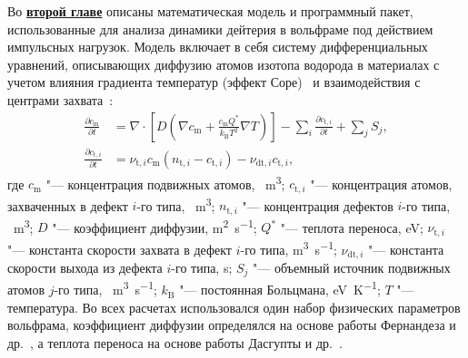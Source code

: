 Во \underline{\textbf{второй главе}} описаны математическая модель и программный пакет, использованные для анализа динамики дейтерия в вольфраме под действием импульсных нагрузок. Модель включает в себя систему дифференциальных уравнений, описывающих диффузию атомов изотопа водорода в материалах с учетом влияния градиента температур (эффект Соре)~\cite{Longhurst1985} и взаимодействия с центрами захвата~\cite{McNabb1963}: 
\begin{subequations}
    \label{eq:hydrogen_transport}
    \begin{align}
        \frac{\partial c_\mathrm{m}}{\partial t} & = \nabla \cdot \left[ D \left( \nabla c_\mathrm{m} + \frac{c_\mathrm{m} Q^*}{k_\mathrm{B}T^2} \nabla T \right) \right] - \sum \limits_i \frac{\partial c_{\mathrm{t},i}}{\partial t} + \sum \limits_j S_j, \\
        \frac{\partial c_{\mathrm{t},i}}{\partial t} & = \nu_{\mathrm{t},i} c_\mathrm{m} (n_{\mathrm{t},i} - c_{\mathrm{t},i}) - \nu_{\mathrm{dt},i} c_{\mathrm{t},i},
    \end{align}    
\end{subequations}
где \( c_\mathrm{m} \) "--- концентрация подвижных атомов, \si{\per\meter\cubed}; \( c_{\mathrm{t},i} \) "--- концентрация атомов, захваченных в дефект $i$-го типа, \si{\per\meter\cubed}; \( n_{\mathrm{t},i} \) "--- концентрация дефектов $i$-го типа, \si{\per\meter\cubed}; \( D \) "--- коэффициент диффузии, \si{\meter\squared\per\second}; \( Q^* \) "--- теплота переноса, \si{\electronvolt}; \( \nu_{\mathrm{t},i} \) "--- константа скорости захвата в дефект $i$-го типа, \si{\meter\cubed\per\second}; \( \nu_{\mathrm{dt},i} \) "--- константа скорости выхода из дефекта $i$-го типа, \si{\second}; \( S_j \) "--- объемный источник подвижных атомов $j$-го типа, \si{\per\meter\cubed\per\second}; \( k_\mathrm{B} \) "--- постоянная Больцмана, \si{\electronvolt\per\kelvin}; \( T \) "--- температура. Во всех расчетах использовался один набор физических параметров вольфрама, коэффициент диффузии определялся на основе работы Фернандеза и др.~\cite{Fernandez2015}, а теплота переноса на основе работы Дасгупты и др.~\cite{Dasgupta2023}.

